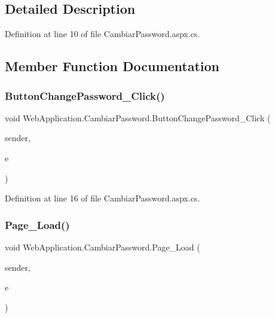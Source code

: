 \subsection{Detailed Description}


Definition at line 10 of file Cambiar\+Password.\+aspx.\+cs.



\subsection{Member Function Documentation}
\mbox{\label{classWebApplication_1_1CambiarPassword_a16763411a7d5b22456dddfc48a50ac9b}} 
\subsubsection{\texorpdfstring{ButtonChangePassword\_Click()}{ButtonChangePassword\_Click()}}
{\footnotesize\ttfamily void Web\+Application.\+Cambiar\+Password.\+Button\+Change\+Password\+\_\+\+Click (\begin{DoxyParamCaption}\item[{object}]{sender,  }\item[{Event\+Args}]{e }\end{DoxyParamCaption})\hspace{0.3cm}{\ttfamily [protected]}}



Definition at line 16 of file Cambiar\+Password.\+aspx.\+cs.

\mbox{\label{classWebApplication_1_1CambiarPassword_a429a7b26a29f62156be73195797a15de}} 
\subsubsection{\texorpdfstring{Page\_Load()}{Page\_Load()}}
{\footnotesize\ttfamily void Web\+Application.\+Cambiar\+Password.\+Page\+\_\+\+Load (\begin{DoxyParamCaption}\item[{object}]{sender,  }\item[{Event\+Args}]{e }\end{DoxyParamCaption})\hspace{0.3cm}{\ttfamily [protected]}}



